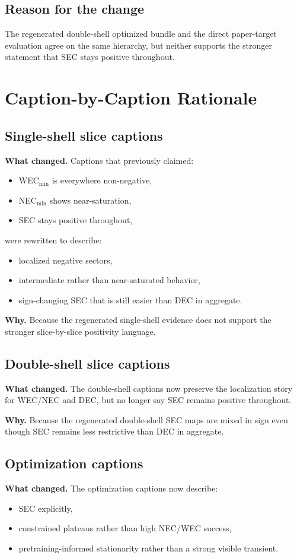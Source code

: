 \documentclass[11pt]{article}
\begin{document}
\subsection*{Reason for the change}
The regenerated double-shell optimized bundle and the direct paper-target evaluation agree on the
same hierarchy, but neither supports the stronger statement that SEC stays positive throughout.

\section*{Caption-by-Caption Rationale}
\subsection*{Single-shell slice captions}
\textbf{What changed.}
Captions that previously claimed:
\begin{itemize}[leftmargin=*]
\item WEC$_{\min}$ is everywhere non-negative,
\item NEC$_{\min}$ shows near-saturation,
\item SEC stays positive throughout,
\end{itemize}
were rewritten to describe:
\begin{itemize}[leftmargin=*]
\item localized negative sectors,
\item intermediate rather than near-saturated behavior,
\item sign-changing SEC that is still easier than DEC in aggregate.
\end{itemize}

\textbf{Why.}
Because the regenerated single-shell evidence does not support the stronger slice-by-slice positivity language.

\subsection*{Double-shell slice captions}
\textbf{What changed.}
The double-shell captions now preserve the localization story for WEC/NEC and DEC, but no longer say SEC remains positive throughout.

\textbf{Why.}
Because the regenerated double-shell SEC maps are mixed in sign even though SEC remains less restrictive than DEC in aggregate.

\subsection*{Optimization captions}
\textbf{What changed.}
The optimization captions now describe:
\begin{itemize}[leftmargin=*]
\item SEC explicitly,
\item constrained plateaus rather than high NEC/WEC success,
\item pretraining-informed stationarity rather than a strong visible transient.
\end{itemize}
\end{document}
